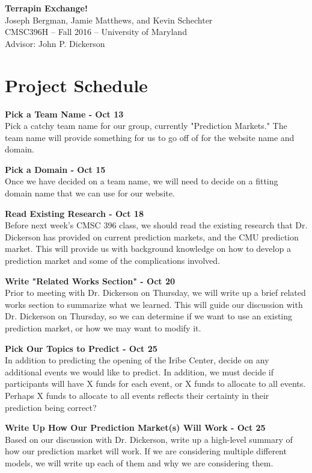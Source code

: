 \documentclass[12pt]{article}
\begin{document}
\begin{center}
{\Large \textbf{Terrapin Exchange!}}\\
Joseph Bergman, Jamie Matthews, and Kevin Schechter\\
CMSC396H -- Fall 2016 -- University of Maryland\\
Advisor: John P. Dickerson
\end{center}

\section*{Project Schedule}

\noindent
\textbf{Pick a Team Name - Oct 13} \\
Pick a catchy team name for our group, currently "Prediction Markets." The team name will provide something for us to go off of for the website name and domain. 

\noindent
\textbf{Pick a Domain - Oct 15} \\
Once we have decided on a team name, we will need to decide on a fitting domain name that we can use for our website.

\noindent
\textbf{Read Existing Research - Oct 18} \\
Before next week's CMSC 396 class, we should read the existing research that Dr. Dickerson has provided on current prediction markets, and the CMU prediction market. This will provide us with background knowledge on how to develop a prediction market and some of the complications involved.

\noindent
\textbf{Write "Related Works Section" - Oct 20} \\
Prior to meeting with Dr. Dickerson on Thursday, we will write up a brief related works section to summarize what we learned. This will guide our discussion with Dr. Dickerson on Thursday, so we can determine if we want to use an existing prediction market, or how we may want to modify it. 

\noindent
\textbf{Pick Our Topics to Predict - Oct 25} \\
In addition to predicting the opening of the Iribe Center, decide on any additional events we would like to predict. In addition, we must decide if participants will have X funds for each event, or X funds to allocate to all events. Perhaps X funds to allocate to all events reflects their certainty in their prediction being correct?  

\noindent
\textbf{Write Up How Our Prediction Market(s) Will Work - Oct 25} \\
Based on our discussion with Dr. Dickerson, write up a high-level summary of how our prediction market will work. If we are considering multiple different models, we will write up each of them and why we are considering them.  
\end{document}
